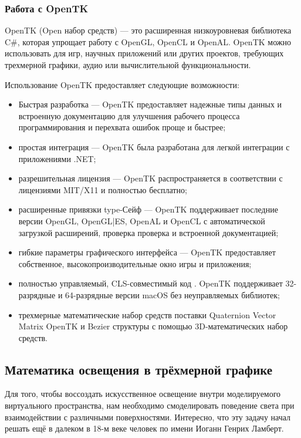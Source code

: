 \subsubsection{Работа с OpenTK}

OpenTK (Open набор средств) — это расширенная низкоуровневая библиотека C\#, которая упрощает работу с OpenGL, OpenCL и OpenAL. OpenTK можно использовать для игр, научных приложений или других проектов, требующих трехмерной графики, аудио или вычислительной функциональности.

Использование OpenTK предоставляет следующие возможности:
\begin{itemize}
	\item Быстрая разработка — OpenTK предоставляет надежные типы данных и встроенную документацию для улучшения рабочего процесса программирования и перехвата ошибок проще и быстрее;
	\item простая интеграция — OpenTK была разработана для легкой интеграции с приложениями .NET;
	\item разрешительная лицензия — OpenTK распространяется в соответствии с лицензиями MIT/X11 и полностью бесплатно;
	\item расширенные привязки type-Сейф — OpenTK поддерживает последние версии OpenGL, OpenGL|ES, OpenAL и OpenCL с автоматической загрузкой расширений, проверка проверка и встроенной документацией;
	\item гибкие параметры графического интерфейса — OpenTK предоставляет собственное, высокопроизводительные окно игры и приложения;
	\item полностью управляемый, CLS-совместимый код . OpenTK поддерживает 32-разрядные и 64-разрядные версии macOS без неуправляемых библиотек;
	\item трехмерные математические набор средств поставки Quaternion Vector Matrix OpenTK и Bezier структуры с помощью 3D-математических набор средств.
\end{itemize}

\subsection{Математика освещения в трёхмерной графике}

Для того, чтобы воссоздать искусственное освещение внутри моделируемого виртуального пространства, нам необходимо смоделировать поведение света при взаимодействии с различными поверхностями. Интересно, что эту задачу начал решать ещё в далеком в 18-м веке человек по имени Иоганн Генрих Ламберт.


